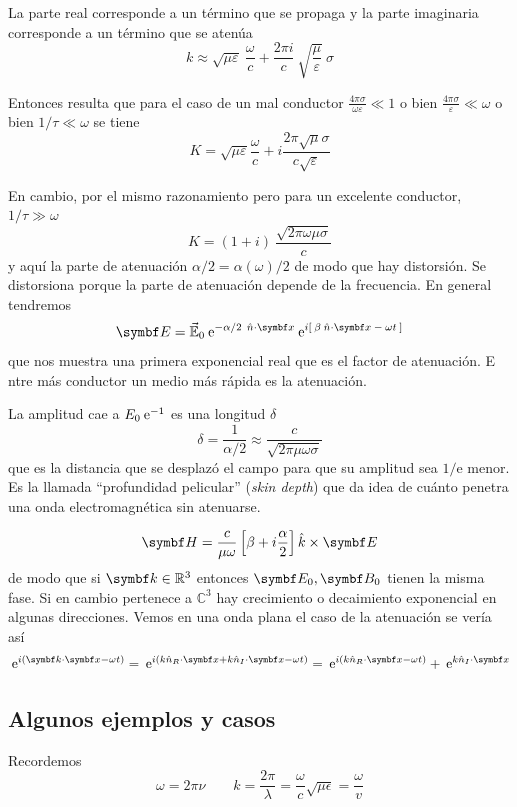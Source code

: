 \documentclass[10pt,oneside]{CBFT_book}
\begin{document}
La parte real corresponde a un término que se propaga y la parte imaginaria 
corresponde a un término que se atenúa
\[
	k \approx  \sqrt{ \mu \varepsilon } \: \frac{\omega}{c} + 
	 \frac{2 \pi i}{c} \: \sqrt{ \frac{ \mu }{ \varepsilon } } \: \sigma
\]

Entonces resulta que para el caso de un mal conductor $ \frac{4\pi\sigma}{\omega \varepsilon} \ll 1 $ o bien 
$ \frac{4\pi\sigma}{\varepsilon} \ll \omega $ o bien $ 1/\tau \ll \omega $ se tiene 
\[
	K = \sqrt{ \mu \varepsilon }\frac{\omega}{c} +
	i \frac{2\pi\sqrt{\mu}\sigma}{c\sqrt{\varepsilon}}
\]

En cambio, por el mismo razonamiento pero para un excelente conductor, $1/\tau \gg \omega$
\[
	K = ( 1 + i ) \: \frac{ \sqrt{2\pi\omega\mu\sigma} }{ c }
\]
y aquí la parte de atenuación $\alpha/2 = \alpha(\omega)/2$ de modo que hay distorsión.
Se distorsiona porque la parte de atenuación depende de la frecuencia.
En general tendremos
\[
	\vb{E} = \vec{ \mathbb{E} }_0 \euler^{ -\alpha/2 \: \nver\cdot\vb{x} } 
	\euler^{ i [ \: \beta \: \hat{n}\cdot\vb{x} \: - \: \omega t \: ] }
\]
que nos muestra una primera exponencial real que es el factor de atenuación. E
ntre más conductor un medio más rápida es la atenuación.

La amplitud cae a $E_0 \:\mathrm{e}^{-1}$ es una longitud $\delta$
\[
	\delta = \frac{1}{\alpha/2} \approx \frac{ c }{ \sqrt{ 2 \pi \mu \omega \sigma } }
\]
que es la distancia que se desplazó el campo para que su amplitud sea $1/\mathrm{e}$ menor.
Es la llamada ``profundidad pelicular'' ({\it skin depth}) que da idea de cuánto penetra una onda
electromagnética sin atenuarse.

\[
	\vb{H} = \frac{c}{\mu\omega}\left[ \beta + i \frac{\alpha}{2} \right] \hat{k}\times \vb{E}
\]
de modo que si $\vb{k} \in \mathbb{R}^3$ entonces $\vb{E}_0, \vb{B}_0$ tienen la misma fase. Si en cambio 
 pertenece a $\mathbb{C}^3$ hay crecimiento o decaimiento exponencial en algunas direcciones.
Vemos en una onda plana el caso de la atenuación se vería así
\[
	\euler^{i(\vb{k}\cdot\vb{x}-\omega t)} =
	\euler^{i( k\hat{n}_R \cdot\vb{x} + k\hat{n}_I \cdot\vb{x} -\omega t)} =
	\euler^{i( k\hat{n}_R \cdot\vb{x} -\omega t) } + \euler^{ k\hat{n}_I \cdot\vb{x} }
\]

\subsection{Algunos ejemplos y casos}

Recordemos 
\[
	\omega = 2\pi\nu  \qquad k=\frac{2\pi}{\lambda}=\frac{\omega}{c}\sqrt{\mu\epsilon} =\frac{\omega}{v}
\]
\end{document}
